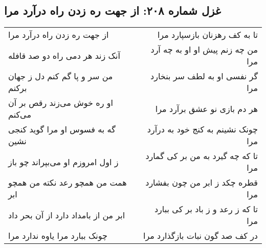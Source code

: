 \begin{center}
\section*{غزل شماره ۲۰۸: از جهت ره زدن راه درآرد مرا}
\label{sec:0208}
\begin{longtable}{l p{0.5cm} r}
از جهت ره زدن راه درآرد مرا
&&
تا به کف رهزنان بازسپارد مرا
\\
آنک زند هر دمی راه دو صد قافله
&&
من چه زنم پیش او او به چه آرد مرا
\\
من سر و پا گم کنم دل ز جهان برکنم
&&
گر نفسی او به لطف سر بنخارد مرا
\\
او ره خوش می‌زند رقص بر آن می‌کنم
&&
هر دم بازی نو عشق برآرد مرا
\\
گه به فسوس او مرا گوید کنجی نشین
&&
چونک نشینم به کنج خود به درآرد مرا
\\
ز اول امروزم او می‌بپراند چو باز
&&
تا که چه گیرد به من بر کی گمارد مرا
\\
همت من همچو رعد نکته من همچو ابر
&&
قطره چکد ز ابر من چون بفشارد مرا
\\
ابر من از بامداد دارد از آن بحر داد
&&
تا که ز رعد و ز باد بر کی ببارد مرا
\\
چونک ببارد مرا یاوه ندارد مرا
&&
در کف صد گون نبات بازگذارد مرا
\\
\end{longtable}
\end{center}
